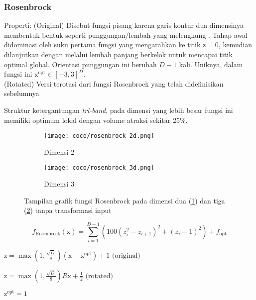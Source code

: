 \subsubsection*{Rosenbrock}
\noindent Properti:
(Original) Disebut fungsi pisang karena garis kontur dua dimensinya membentuk bentuk seperti punggungan/lembah yang melengkung \citep{Rosenbrock:1960:AMF}. Tahap awal didominasi oleh suku pertama fungsi yang mengarahkan ke titik $\mathrm{z} = 0$, kemudian dilanjutkan dengan melalui lembah panjang berkelok untuk mencapai titik optimal global. Orientasi punggungan ini berubah $D-1$ kali. Uniknya, dalam fungsi ini $\mathrm{x}^{\text{opt}}\in[-3, 3]^D$.\\
(Rotated) Versi terotasi dari fungsi Rosenbrock yang telah didefinisikan sebelumnya
\begin{packed_item}
  \item Struktur ketergantungan \textit{tri-band}, pada dimensi yang lebih besar fungsi ini memiliki optimum lokal dengan volume atraksi sekitar 25\%.
\end{packed_item}
\begin{figure}[H]
	\centering
	\begin{subfigure}[b]{0.4\textwidth}
		\centering
		\texttt{[image: coco/rosenbrock\_2d.png]}
		\caption{Dimensi 2}
		\label{fig:rosenbrock_coco_2d}
	\end{subfigure}
	\hfill
	\begin{subfigure}[b]{0.4\textwidth}
		\centering
		\texttt{[image: coco/rosenbrock\_3d.png]}
		\caption{Dimensi 3}
		\label{fig:rosenbrock_coco_3d}
	\end{subfigure}
	\caption{Tampilan grafik fungsi Rosenbrock pada dimensi dua (\cref{fig:rosenbrock_coco_2d}) dan tiga (\cref{fig:rosenbrock_coco_3d}) tanpa transformasi input}
	\label{fig:rosenbrock_coco}
\end{figure}
\begin{equation}
  f_{\text{Rosenbrock}}(\mathrm{x})=\sum_{i=1}^{D-1}(100(z_i^2-z_{i+1})^2+(z_i-1)^2)+f_{\text{opt}}
\end{equation}
\begin{packed_item}
    \item $\mathrm{z}=\max(1,\frac{\sqrt{D}}{8})(\mathrm{x}-\mathrm{x}^{\text{opt}})+1\text{ (original)}$\\
    \item $\mathrm{z}=\max(1,\frac{\sqrt{D}}{8})R\mathrm{x}+\frac{1}{2}\text{ (rotated)}$
    \item $\mathrm{z}^{\text{opt}}=1$
\end{packed_item}

